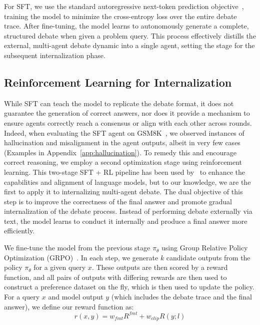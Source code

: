 \documentclass[11pt]{article}
\begin{document}
For SFT, we use the standard autoregressive next-token prediction objective~\cite{Wei2021Finetuned, Ouyang2022Training}, training the model to minimize the cross-entropy loss over the entire debate trace. 
After fine-tuning, the model learns to autonomously generate a complete, structured debate when given a problem query. This process effectively distills the external, multi-agent debate dynamic into a single agent, setting the stage for the subsequent internalization phase. 

\subsection{Reinforcement Learning for Internalization}
While SFT can teach the model to replicate the debate format, it does not guarantee the generation of correct answers, nor does it provide a mechanism to ensure agents correctly reach a consensus or align with each other across rounds. Indeed, when evaluating the SFT agent on GSM8K~\cite{Cobbe2021Training}, we observed instances of hallucination and misalignment in the agent outputs, albeit in very few cases (Examples in Appendix~\ref{app:hallucination}). To remedy this and encourage correct reasoning, we employ a second optimization stage using reinforcement learning. 
This two-stage SFT + RL pipeline has been used by~\citet{shao2024deepseekmathpushinglimitsmathematical, guo2025deepseek} to 
enhance the capabilities and alignment of language models, but to our knowledge, we are the first to apply it to internalizing multi-agent debate. The dual objective of this step is to improve the correctness of the final answer and promote gradual internalization of the debate process. Instead of performing debate externally via text, the model learns to conduct it internally and produce a final answer more efficiently. 

We fine-tune the model from the previous stage $\pi_\theta$ using Group Relative Policy Optimization (GRPO)~\cite{shao2024deepseekmathpushinglimitsmathematical}. In each step, we generate $k$ candidate outputs from the policy $\pi_\theta$ for a given query $x$. These outputs are then scored by a reward function, and all pairs of outputs with differing rewards are then used to construct a preference dataset on the fly, which is then used to update the policy. For a query $x$ and model output $y$ (which includes the debate trace and the final answer), we define our reward function as:
\begin{equation}
    r(x,y) = w_{fmt}R^{fmt} + w_{clip}R(y;l)
\end{equation}
\end{document}
